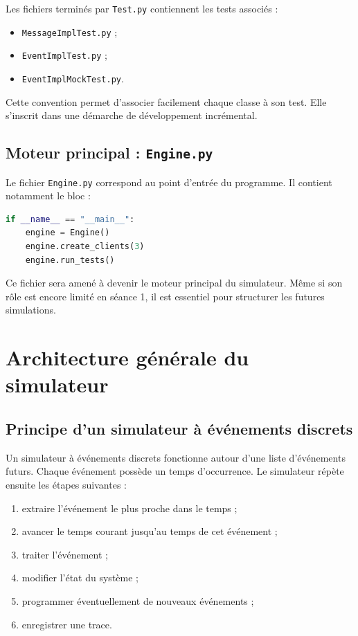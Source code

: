 \documentclass{article}
\begin{document}
Les fichiers terminés par \texttt{Test.py} contiennent les tests associés :
\begin{itemize}[leftmargin=*]
    \item \texttt{MessageImplTest.py} ;
    \item \texttt{EventImplTest.py} ;
    \item \texttt{EventImplMockTest.py}.
\end{itemize}

Cette convention permet d’associer facilement chaque classe à son test. Elle s’inscrit dans une démarche de développement incrémental.

\subsection{Moteur principal : \texttt{Engine.py}}

Le fichier \texttt{Engine.py} correspond au point d’entrée du programme. Il contient notamment le bloc :

\begin{lstlisting}[language=Python, caption=Point d'entrée Python]
if __name__ == "__main__":
    engine = Engine()
    engine.create_clients(3)
    engine.run_tests()
\end{lstlisting}

Ce fichier sera amené à devenir le moteur principal du simulateur. Même si son rôle est encore limité en séance 1, il est essentiel pour structurer les futures simulations.

\section{Architecture générale du simulateur}

\subsection{Principe d’un simulateur à événements discrets}

Un simulateur à événements discrets fonctionne autour d’une liste d’événements futurs. Chaque événement possède un temps d’occurrence. Le simulateur répète ensuite les étapes suivantes :
\begin{enumerate}[leftmargin=*]
    \item extraire l’événement le plus proche dans le temps ;
    \item avancer le temps courant jusqu’au temps de cet événement ;
    \item traiter l’événement ;
    \item modifier l’état du système ;
    \item programmer éventuellement de nouveaux événements ;
    \item enregistrer une trace.
\end{enumerate}
\end{document}

